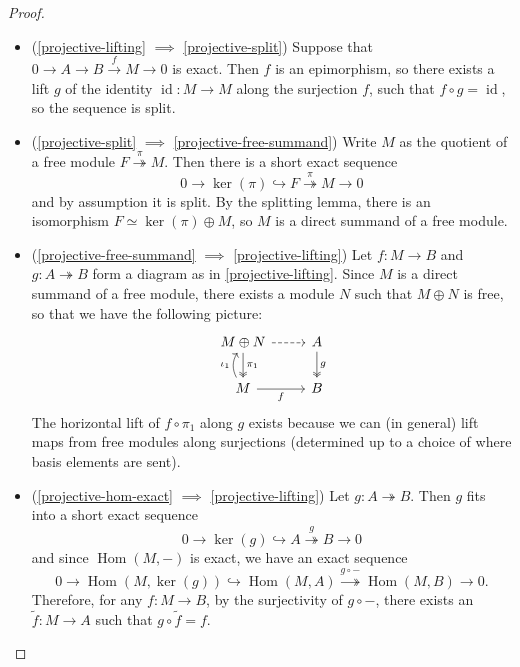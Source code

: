 \documentclass[11pt]{article}
\newcommand{\Hom}{\operatorname{Hom}}
\renewcommand{\ker}{\operatorname{ker}}
\theoremstyle{plain}
\theoremstyle{definition}
\begin{document}
\begin{proof}
\begin{itemize}
    \item (\ref{projective-lifting} \(\implies\) \ref{projective-split}) Suppose that \(0 \to A \to B \overset{f}{\to} M \to 0\) is exact. Then \(f\) is an epimorphism, so there exists a lift \(g\) of the identity \(\operatorname{id} : M \to M\) along the surjection \(f\), such that \(f \circ g = \operatorname{id}\), so the sequence is split.
    \item (\ref{projective-split} \(\implies\) \ref{projective-free-summand}) Write \(M\) as the quotient of a free module \(F \overset{\pi}{\twoheadrightarrow} M\). Then there is a short exact sequence
      \[ 0 \to \ker(\pi) \hookrightarrow F \overset{\pi}{\twoheadrightarrow} M \to 0 \]
      and by assumption it is split. By the splitting lemma, there is an isomorphism \(F \simeq \ker(\pi) \oplus M\), so \(M\) is a direct summand of a free module.
    \item (\ref{projective-free-summand} \(\implies\) \ref{projective-lifting}) Let \(f : M \to B\) and \(g : A \twoheadrightarrow B\) form a diagram as in \ref{projective-lifting}. Since \(M\) is a direct summand of a free module, there exists a module \(N\) such that \(M \oplus N\) is free, so that we have the following picture:
      \[
        \begin{tikzcd}
         M \oplus N \arrow[two heads]{d}{\pi_1} \arrow[dashed]{r} & A \arrow[two heads]{d}{g} \\
         M \arrow[bend left]{u}{\iota_1} \arrow[swap]{r}{f} & B  
        \end{tikzcd}
      \]
      The horizontal lift of \(f \circ \pi_1\) along \(g\) exists because we can (in general) lift maps from free modules along surjections (determined up to a choice of where basis elements are sent).
    \item (\ref{projective-hom-exact} \(\implies\) \ref{projective-lifting}) Let \(g : A \twoheadrightarrow B\). Then \(g\) fits into a short exact sequence
      \[
        0 \to \ker(g) \hookrightarrow A \overset{g}{\twoheadrightarrow} B \to 0
      \]
      and since \(\Hom(M,-)\) is exact, we have an exact sequence
      \[
        0 \to \Hom(M,\ker(g)) \hookrightarrow \Hom(M, A) \overset{g \circ -}{\twoheadrightarrow} \Hom(M, B) \to 0.
      \]
      Therefore, for any \(f : M \to B\), by the surjectivity of \(g \circ -\), there exists an \(\widetilde{f} : M \to A\) such that \(g \circ \widetilde{f} = f\).
  \end{itemize}
\end{proof}
\end{document}
